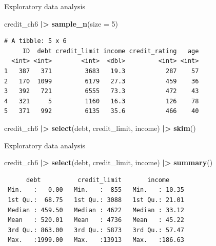 \documentclass[
  ignorenonframetext,
]{beamer}
\newenvironment{Shaded}{\begin{snugshade}}{\end{snugshade}}
\newcommand{\AttributeTok}[1]{\textcolor[rgb]{0.13,0.29,0.53}{#1}}
\newcommand{\DecValTok}[1]{\textcolor[rgb]{0.00,0.00,0.81}{#1}}
\newcommand{\FunctionTok}[1]{\textcolor[rgb]{0.13,0.29,0.53}{\textbf{#1}}}
\newcommand{\NormalTok}[1]{#1}
\newcommand{\SpecialCharTok}[1]{\textcolor[rgb]{0.81,0.36,0.00}{\textbf{#1}}}
\begin{document}
\begin{frame}[fragile]{Exploratory data analysis}
\label{exploratory-data-analysis-15}
\normalsize

\begin{Shaded}
\begin{Highlighting}[]
\NormalTok{credit\_ch6 }\SpecialCharTok{|\textgreater{}} 
  \FunctionTok{sample\_n}\NormalTok{(}\AttributeTok{size =} \DecValTok{5}\NormalTok{)}
\end{Highlighting}
\end{Shaded}

\begin{verbatim}
# A tibble: 5 x 6
     ID  debt credit_limit income credit_rating   age
  <int> <int>        <int>  <dbl>         <int> <int>
1   387   371         3683   19.3           287    57
2   170  1099         6179   27.3           459    36
3   392   721         6555   73.3           472    43
4   321     5         1160   16.3           126    78
5   371   992         6135   35.6           466    40
\end{verbatim}

\normalsize

\normalsize

\begin{Shaded}
\begin{Highlighting}[]
\NormalTok{credit\_ch6 }\SpecialCharTok{|\textgreater{}} 
  \FunctionTok{select}\NormalTok{(debt, credit\_limit, income) }\SpecialCharTok{|\textgreater{}} 
  \FunctionTok{skim}\NormalTok{()}
\end{Highlighting}
\end{Shaded}
\end{frame}

\begin{frame}[fragile]{Exploratory data analysis}
\label{exploratory-data-analysis-16}
\normalsize

\begin{Shaded}
\begin{Highlighting}[]
\NormalTok{credit\_ch6 }\SpecialCharTok{|\textgreater{}} 
  \FunctionTok{select}\NormalTok{(debt, credit\_limit, income) }\SpecialCharTok{|\textgreater{}} 
  \FunctionTok{summary}\NormalTok{()}
\end{Highlighting}
\end{Shaded}

\begin{verbatim}
      debt          credit_limit       income      
 Min.   :   0.00   Min.   :  855   Min.   : 10.35  
 1st Qu.:  68.75   1st Qu.: 3088   1st Qu.: 21.01  
 Median : 459.50   Median : 4622   Median : 33.12  
 Mean   : 520.01   Mean   : 4736   Mean   : 45.22  
 3rd Qu.: 863.00   3rd Qu.: 5873   3rd Qu.: 57.47  
 Max.   :1999.00   Max.   :13913   Max.   :186.63  
\end{verbatim}

\normalsize
\end{frame}
\end{document}
